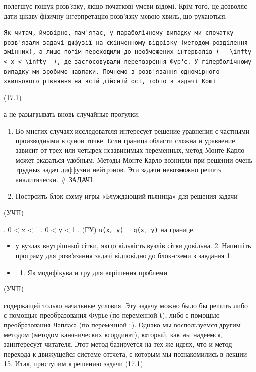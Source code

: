 \documentclass[
  ukrainian,
]{article}
\providecommand{\tightlist}{%
  \setlength{\itemsep}{0pt}\setlength{\parskip}{0pt}}
\begin{document}
полегшує пошук розв'язку, якщо початкові умови відомі. Крім того, це
дозволяє дати цікаву фізичну інтерпретацію розв'язку мовою хвиль, що
рухаються.

\begin{verbatim}
Як читач, ймовірно, пам'ятає, у параболічному випадку ми спочатку розв'язали задачі дифузії на скінченному відрізку (методом розділення змінних), а лише потім переходили до необмежених інтервалів (-  \infty < x < \infty  ), де застосовували перетворення Фур'є. У гіперболічному випадку ми зробимо навпаки. Почнемо з розв'язання одномірного хвильового рівняння на всій дійсній осі, тобто з задачі Коші
\end{verbatim}

(17.1)

а не разыгрывать вновь случайные прогулки.

\begin{enumerate}
\def\labelenumi{\arabic{enumi}.}
\setcounter{enumi}{1}
\tightlist
\item
  Во многих случаях исследователя интересует решение уравнения с
  частными производными в одной точке. Если граница области сложна и
  уравнение зависит от трех или четырех независимых переменных, метод
  Монте-Карло может оказаться удобным. Методы Монте-Карло возникли при
  решении очень трудных задач диффузии нейтронов. Эти задачи невозможно
  решать аналитически. \# ЗАДАЧІ
\item
  Построить блок-схему игры «Блуждающий пьяница» для решения задачи
\end{enumerate}

(УЧП)

, 0 \textless{} x \textless{} 1 , 0 \textless{} y \textless{} 1 , (ГУ)
\texttt{u(x,\ y)} = \texttt{g(x,\ y)} на границе,

\begin{itemize}
\item
  у вузлах внутрішньої сітки, якщо кількість вузлів сітки довільна. 2.
  Напишіть програму для розв'язання задачі відповідно до блок-схеми з
  завдання 1.
\item
  \begin{enumerate}
  \def\labelenumi{\arabic{enumi}.}
  \setcounter{enumi}{2}
  \tightlist
  \item
    Як модифікувати гру для вирішення проблеми
  \end{enumerate}
\end{itemize}

(УЧП)

содержащей только начальные условия. Эту задачу можно было бы решить
либо с помощью преобразования Фурье (по переменной t), либо с помощью
преобразования Лапласа (по переменной t). Однако мы воспользуемся другим
методом (методом канонических координат), который, как мы надеемся,
заинтересует читателя. Этот метод базируется на тех же идеях, что и
метод перехода к движущейся системе отсчета, с которым мы познакомились
в лекции 15. Итак, приступим к решению задачи (17.1).
\end{document}
